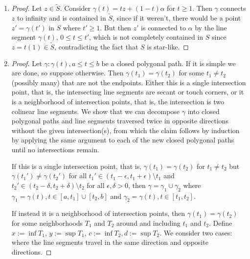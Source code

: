 \documentclass[11pt, letterpaper]{article}
\begin{document}
\thispagestyle{firststyle}


\begin{enumerate}
  \item \begin{proof}
    Let $z \in \tilde S$. Consider $\gamma(t) = tz + (1 - t)\alpha$ for $t \geq 1$. Then $\gamma$ connects $z$ to infinity and is contained in $\tilde S$, since if it weren't, there would be a point $z' = \gamma(t')$ in $S$ where $t' \geq 1$. But then $z'$ is connected to $\alpha$ by the line segment $\gamma(t)$, $0 \leq t \leq t'$, which is not completely contained in $S$ since $z = t(1) \in \tilde S$, contradicting the fact that $S$ is star-like.
  \end{proof}

  \item \begin{proof}
    Let $\gamma: \gamma(t), a \leq t \leq b$ be a closed polygonal path. If it is simple we are done, so suppose otherwise. Then $\gamma(t_1) = \gamma(t_2)$ for some $t_1 \neq t_2$ (possibly many) that are not the endpoints. Either this is a single intersection point, that is, the intersecting line segments are secant or touch corners, or it is a neighborhood of intersection points, that is, the intersection is two colinear line segments. We show that we can decompose $\gamma$ into closed polygonal paths and line segments traversed twice in opposite directions without the given intersection(s), from which the claim follows by induction by applying the same argument to each of the new closed polygonal paths until no intersections remain.
    
    If this is a single intersection point, that is, $\gamma(t_1) = \gamma(t_2)$ for $t_1 \neq t_2$ but $\gamma(t_1') \neq \gamma(t_2')$ for all $t_1' \in (t_1 - \epsilon, t_1 + \epsilon) \setminus t_1$ and $t_2' \in (t_2 - \delta, t_2 + \delta) \setminus t_2$ for all $\epsilon, \delta > 0$, then $\gamma = \gamma_1 \cup \gamma_2$ where $\gamma_1 = \gamma(t), t \in [a, t_1] \cup [t_2, b]$ and $\gamma_2 = \gamma(t), t \in [t_1, t_2]$.

    If instead it is a neighborhood of intersection points, then $\gamma(t_1) = \gamma(t_2)$ for some neighborhoods $T_1$ and $T_2$ around and including $t_1$ and $t_2$. Define $x := \inf T_1$, $y := \sup T_1$, $c := \inf T_2, d := \sup T_2$. We consider two cases: where the line segments travel in the same direction and opposite directions.
    

\end{proof}
\end{enumerate}
\end{document}
